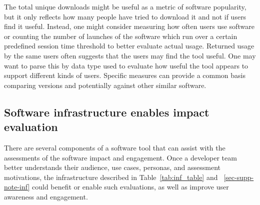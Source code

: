 \documentclass{article}
\begin{document}
The total unique downloads might be useful as a metric of software popularity, but it only reflects how many people have tried to download it and not if users find it useful. Instead, one might consider measuring how often users use software or  counting the number of launches of the software which run over a certain predefined session time threshold to better evaluate actual usage. Returned usage by the same users often suggests that the users may find the tool useful. One may want to parse this by data type used to evaluate how useful the tool appears to support different kinds of users.   Specific measures can provide a common basis comparing versions and potentially against other similar software.


\subsection{Software infrastructure enables impact evaluation}
There are several components of a software tool that can assist with the assessments of the software impact and engagement. Once a developer team better understands their audience, use cases, personas, and assessment motivations, the infrastructure described in Table~\ref{tab:inf_table} and ~\ref{sec-supp-note-inf} could benefit or enable such evaluations, as well as improve user awareness and engagement. 
\end{document}
